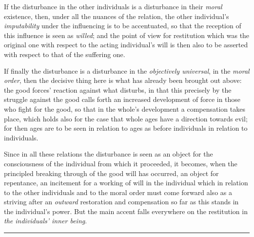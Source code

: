 \documentclass[12pt,a4paper]{book}
\begin{document}
If the disturbance in the other individuals is a disturbance in their
\emph{moral} existence, then, under all the nuances of the relation, the other
individual's \emph{imputability} under the influencing is to be accentuated, so
that the reception of this influence is seen as \emph{willed}; and the point of
view for restitution which was the original one with respect to the acting
individual's will is then also to be asserted with respect to that of the
suffering one.

If finally the disturbance is a disturbance in the \emph{objectively universal},
in the \emph{moral order}, then the decisive thing here is what has already been
brought out above: the good forces' reaction against what disturbs, in that this
precisely by the struggle against the good calls forth an increased development
of force in those who fight for the good, so that in the whole's development a
compensation takes place, which holds also for the case that whole ages have a
direction towards evil; for then ages are to be seen in relation to ages as
before individuals in relation to individuals.

Since in all these relations the disturbance is seen as an object for the
consciousness of the individual from which it proceeded, it becomes, when the
principled breaking through of the
good will has occurred, an object for repentance, an incitement for a working of
will in the individual which in relation to the other individuals and to the
moral order must come forward also as a striving after an \emph{outward}
restoration and compensation so far as this stands in the individual's power.
But the main accent falls everywhere on the restitution in \emph{the
individuals' inner being}.

\begin{center}\rule{2cm}{0.4pt}\end{center}
\end{document}
